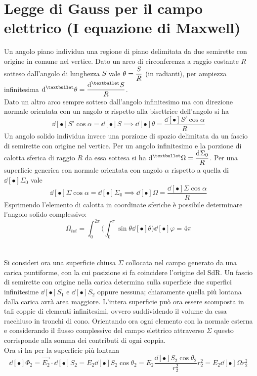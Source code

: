 \section{Legge di Gauss per il campo elettrico (I equazione di Maxwell)}
Un angolo piano individua una regione di piano delimitata da due semirette con origine in comune nel vertice. Dato un arco di circonferenza a raggio costante $R$ sotteso dall'angolo di lunghezza $S$ vale $\displaystyle \theta = \frac{S}{R}$ (in radianti), per ampiezza infinitesima $\ds \dd[•]{\theta} = \frac{\dd[•]{S}}{R}$.
\\Dato un altro arco sempre sotteso dall'angolo infinitesimo ma con direzione normale orientata con un angolo $\alpha$ rispetto alla bisettrice dell'angolo si ha
\[\dd[•]{S'} \cos \alpha = \dd[•]{S} \implies \dd[•]{\theta} = \frac{\dd[•]{S'} \cos \alpha }{R}\]
Un angolo solido individua invece una porzione di spazio delimitata da un fascio di semirette con origine nel vertice. Per un angolo infinitesimo e la porzione di calotta sferica di raggio $R$ da essa sottesa si ha $\ds \dd[•]{\Omega} = \frac{\dd[]{\Sigma_0}}{R}$. Per una superficie generica con normale orientata con angolo $\alpha$ rispetto a quella di $\dd[•]{\Sigma_0}$ vale
\[\dd[•]{\Sigma} \cos \alpha = \dd[•]{\Sigma_0} \implies \dd[•]{\Omega} = \frac{\dd[•]{\Sigma} \cos \alpha}{R}\]
Esprimendo l'elemento di calotta in coordinate sferiche è possibile determinare l'angolo solido complessivo:
\[\Omega_{tot} = \int_0^{2\pi} \big(\int_0^\pi \sin \theta \dd[•]{\theta}\big) \dd[•]{\varphi} = 4 \pi\]
\\~\\
Si consideri ora una superficie chiusa $\Sigma$ collocata nel campo generato da una carica puntiforme, con la cui posizione si fa coincidere l'origine del SdR. Un fascio di semirette con origine nella carica determina sulla superficie due superfici infinitesime $\dd[•]{S_1}$ e $\dd[•]{S_2}$ oppure nessuna; chiaramente quella più lontana dalla carica avrà area maggiore. L'intera superficie può ora essere scomposta in tali coppie di elementi infinitesimi, ovvero suddividendo il volume da essa racchiuso in tronchi di cono. Orientando ora ogni elemento con la normale esterna e considerando il flusso complessivo del campo elettrico attraverso $\Sigma$ questo corrisponde alla somma dei contributi di ogni coppia.
\\Ora si ha per la superficie più lontana
\[\dd[•]{\Phi_2} = \vec{E_2} \cdot \dd[•]{S_2} = E_2 \dd[•]{S_2} \cos \theta_2 = E_2 \frac{\dd[•]{S_2} \cos \theta_2}{r_2^2} r_2^2 = E_2 \dd[•]{\Omega} r_2^2\]
